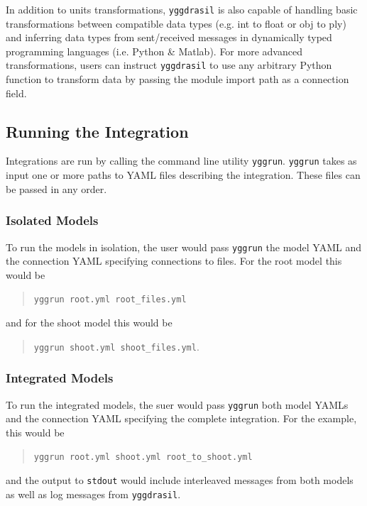 \documentclass[journal]{IEEEtran}
\newcommand{\pkg}{{\tt yggdrasil}{}}
\newcommand{\pkgrun}{{\tt yggrun}}
\begin{document}
In addition to units transformations, {\pkg} is also capable of handling basic transformations between compatible data types (e.g. int to float or obj to ply) and inferring data types from sent/received messages in dynamically typed programming languages (i.e. Python \& Matlab). For more advanced transformations, users can instruct {\pkg} to use any arbitrary Python function to transform data by passing the module import path as a connection field.

\subsection{Running the Integration}
%
Integrations are run by calling the command line utility {\pkgrun}. {\pkgrun} takes as input one or more paths to YAML files describing the integration. These files can be passed in any order.

\subsubsection{Isolated Models}
%
To run the models in isolation, the user would pass {\pkgrun} the model YAML and the connection YAML specifying connections to files. For the root model this would be 
%
\begin{quote}
{\tt {\pkgrun} root.yml root\_files.yml} 
\end{quote}
%
and for the shoot model this would be 
%
\begin{quote}
{\tt {\pkgrun} shoot.yml shoot\_files.yml}. 
\end{quote}

\subsubsection{Integrated Models}
%
To run the integrated models, the suer would pass {\pkgrun} both model YAMLs and the connection YAML specifying the complete integration. For the example, this would be 
\begin{quote}
{\tt {\pkgrun} root.yml shoot.yml root\_to\_shoot.yml}
\end{quote}
and the output to {\tt stdout} would include interleaved messages from both models as well as log messages from {\pkg}.

\end{document}
